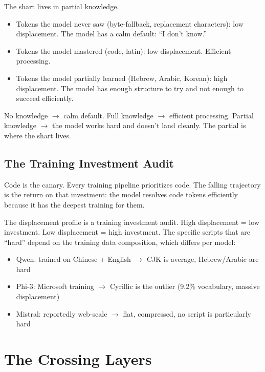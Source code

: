 \documentclass[11pt,a4paper]{article}
\begin{document}
The shart lives in partial knowledge.

\begin{itemize}[nosep]
\item Tokens the model never saw (byte-fallback, replacement characters): low displacement. The model has a calm default: ``I don't know.''
\item Tokens the model mastered (code, latin): low displacement. Efficient processing.
\item Tokens the model partially learned (Hebrew, Arabic, Korean): high displacement. The model has enough structure to try and not enough to succeed efficiently.
\end{itemize}

No knowledge $\to$ calm default. Full knowledge $\to$ efficient processing. Partial knowledge $\to$ the model works hard and doesn't land cleanly. The partial is where the shart lives.

\subsection{The Training Investment Audit}

Code is the canary. Every training pipeline prioritizes code. The falling trajectory is the return on that investment: the model resolves code tokens efficiently because it has the deepest training for them.

The displacement profile is a training investment audit. High displacement = low investment. Low displacement = high investment. The specific scripts that are ``hard'' depend on the training data composition, which differs per model:

\begin{itemize}[nosep]
\item Qwen: trained on Chinese + English $\to$ CJK is average, Hebrew/Arabic are hard
\item Phi-3: Microsoft training $\to$ Cyrillic is the outlier (9.2\% vocabulary, massive displacement)
\item Mistral: reportedly web-scale $\to$ flat, compressed, no script is particularly hard
\end{itemize}

\section{The Crossing Layers}
\end{document}
